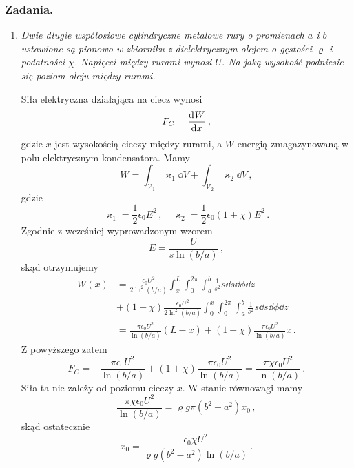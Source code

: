 \documentclass[../main.tex]{subfiles}
\begin{document}
\subsubsection*{Zadania.}
\begin{enumerate}
    \item \textit{Dwie długie współosiowe cylindryczne metalowe rury o promienach \(a\) i \(b\)
    ustawione są pionowo w zbiorniku z dielektrycznym olejem o gęstości \(\varrho\) i podatności
    \(\chi\). Napięcei między rurami wynosi \(U\). Na jaką wysokość podniesie się poziom oleju
    między rurami.}
    \medskip
    
    Siła elektryczna działająca na ciecz wynosi
    \begin{equation*}
        F_C=\dv[]{W}{x}\,,
    \end{equation*}
    gdzie \(x\) jest wysokością cieczy między rurami, a \(W\) energią zmagazynowaną w polu
    elektrycznym kondensatora. Mamy
    \begin{equation*}
        W=\int_{\mathcal{V}_1}\varkappa_1\dd{V}+\int_{\mathcal{V}_2}\varkappa_2\dd{V}\,,
    \end{equation*}
    gdzie
    \begin{equation*}
        \varkappa_1=\frac{1}{2}\epsilon_0E^2\,,\quad \varkappa_2=\frac{1}{2}\epsilon_0(1+\chi)E^2\,.
    \end{equation*}
    Zgodnie z wcześniej wyprowadzonym wzorem
    \begin{equation*}
        E=\frac{U}{s\ln(b/a)}\,,
    \end{equation*}
    skąd otrzymujemy
    \begin{equation*}
    \begin{split}
        W(x)&=\frac{\epsilon_0U^2}{2\ln^2(b/a)}\int_x^{L}\int_0^{2\pi}\int_a^b\frac{1}{s^2}s\dd{s}\dd{\phi}\dd{z}\\
        &+(1+\chi)\frac{\epsilon_0U^2}{2\ln^2(b/a)}\int_0^{x}\int_0^{2\pi}\int_a^b\frac{1}{s^2}s\dd{s}\dd{\phi}\dd{z}\\
        &=\frac{\pi\epsilon_0U^2}{\ln(b/a)}(L-x)+(1+\chi)\frac{\pi\epsilon_0U^2}{\ln(b/a)}x\,.
    \end{split}
    \end{equation*}
    Z powyższego zatem
    \begin{equation*}
        F_C=-\frac{\pi\epsilon_0U^2}{\ln(b/a)}+(1+\chi)\frac{\pi\epsilon_0U^2}{\ln(b/a)}=\frac{\pi\chi\epsilon_0U^2}{\ln(b/a)}\,.
    \end{equation*}
    Siła ta nie zależy od poziomu cieczy \(x\). W stanie równowagi mamy
    \begin{equation*}
        \frac{\pi\chi\epsilon_0U^2}{\ln(b/a)}=\varrho g\pi(b^2-a^2)x_0\,,
    \end{equation*}
    skąd ostatecznie
    \begin{equation*}
        x_0=\frac{\epsilon_0\chi U^2}{\varrho g(b^2-a^2)\ln(b/a)}\,.
    \end{equation*}
\end{enumerate}
\pagebreak
\end{document}
